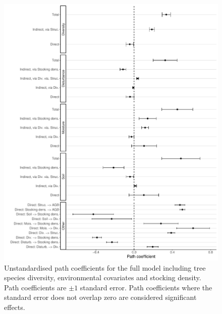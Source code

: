 \documentclass[11pt,a4paper]{article}
\begin{document}
\begin{figure}[H]
\centering
	\includegraphics[width=\textwidth]{full_model_slopes}
	\caption{Unstandardised path coefficients for the full model including tree species diversity, environmental covariates and stocking density. Path coefficients are $\pm1$ standard error. Path coefficients where the standard error does not overlap zero are considered significant effects.}
	\label{full_model_slopes}
\end{figure}

\end{document}
